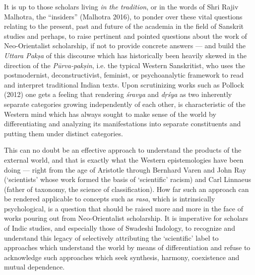 It is up to those scholars living \textsl{in the tradition}, or in the words of Shri Rajiv Malhotra, the “insiders” (Malhotra 2016), to ponder over these vital questions relating to the present, past and future of the academia in the field of Sanskrit studies and perhaps, to raise pertinent and pointed questions about the work of Neo-Orientalist scholarship, if not to provide concrete answers --- and build the \textsl{Uttara Pakṣa} of this discourse which has historically been heavily skewed in the direction of the \textsl{Pūrva-pakṣin}, i.e. the typical Western Sanskritist, who uses the postmodernist, deconstructivist, feminist, or psychoanalytic framework to read and interpret traditional Indian texts. Upon scrutinizing works such as Pollock (2012) one gets a feeling that rendering \textsl{śravya} and \textsl{dṛśya} as two inherently separate categories growing independently of each other, is characteristic of the Western mind which has always sought to make sense of the world by differentiating and analyzing its manifestations into separate constituents and putting them under distinct categories. 

This can no doubt be an effective approach to understand the products of the external world, and that is exactly what the Western epistemologies have been doing --- right from the age of Aristotle through Bernhard Varen and John Ray (‘scientists’ whose work formed the basis of ‘scientific’ racism) and Carl Linnaeus (father of taxonomy, the science of classification). How far such an approach can be rendered applicable to concepts such as \textsl{rasa}, which is intrinsically psychological, is a question that should be raised more and more in the face of works pouring out from Neo-Orientalist scholarship. It is imperative for scholars of Indic studies, and especially those of Swadeshi Indology, to recognize and understand this legacy of selectively attributing the ‘scientific’ label to approaches which understand the world by means of differentiation and refuse to acknowledge such approaches which seek synthesis, harmony, coexistence and mutual dependence.
 
